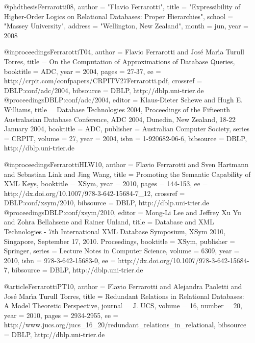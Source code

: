 \documentclass{article}
\begin{document}
@phdthesis{Ferrarotti08,
  author    = "Flavio Ferrarotti",
  title     = "Expressibility of Higher-Order Logics on Relational Databases: Proper Hierarchies",
  school    = "Massey University",
  address   = "Wellington, New Zealand",
  month     = jun,
  year      = 2008
}

@inproceedings{FerrarottiT04,
  author    = {Flavio Ferrarotti and
               Jos{\'e} Mar{\'{\i}}a {Turull Torres}},
  title     = {On the Computation of Approximations of Database Queries},
  booktitle = {ADC},
  year      = {2004},
  pages     = {27-37},
  ee        = {http://crpit.com/confpapers/CRPITV27Ferrarotti.pdf},
  crossref  = {DBLP:conf/adc/2004},
  bibsource = {DBLP, http://dblp.uni-trier.de}
}
@proceedings{DBLP:conf/adc/2004,
  editor    = {Klaus-Dieter Schewe and
               Hugh E. Williams},
  title     = {Database Technologies 2004, Proceedings of the Fifteenth
               Australasian Database Conference, ADC 2004, Dunedin, New
               Zealand, 18-22 January 2004},
  booktitle = {ADC},
  publisher = {Australian Computer Society},
  series    = {CRPIT},
  volume    = {27},
  year      = {2004},
  isbn      = {1-920682-06-6},
  bibsource = {DBLP, http://dblp.uni-trier.de}
}

@inproceedings{FerrarottiHLW10,
  author    = {Flavio Ferrarotti and
               Sven Hartmann and
               Sebastian Link and
               Jing Wang},
  title     = {Promoting the Semantic Capability of {XML} Keys},
  booktitle = {XSym},
  year      = {2010},
  pages     = {144-153},
  ee        = {http://dx.doi.org/10.1007/978-3-642-15684-7_12},
  crossref  = {DBLP:conf/xsym/2010},
  bibsource = {DBLP, http://dblp.uni-trier.de}
}
@proceedings{DBLP:conf/xsym/2010,
  editor    = {Mong-Li Lee and
               Jeffrey Xu Yu and
               Zohra Bellahsene and
               Rainer Unland},
  title     = {Database and {XML} Technologies - 7th International {XML} Database
               Symposium, XSym 2010, Singapore, September 17, 2010. Proceedings},
  booktitle = {XSym},
  publisher = {Springer},
  series    = {Lecture Notes in Computer Science},
  volume    = {6309},
  year      = {2010},
  isbn      = {978-3-642-15683-0},
  ee        = {http://dx.doi.org/10.1007/978-3-642-15684-7},
  bibsource = {DBLP, http://dblp.uni-trier.de}
}

@article{FerrarottiPT10,
  author    = {Flavio Ferrarotti and
               Alejandra Paoletti and
               Jos\'e Mar\'{\i}a {Turull Torres}},
  title     = {Redundant Relations in Relational Databases: A Model Theoretic
               Perspective},
  journal   = {J. UCS},
  volume    = {16},
  number    = {20},
  year      = {2010},
  pages     = {2934-2955},
  ee        = {http://www.jucs.org/jucs_16_20/redundant_relations_in_relational},
  bibsource = {DBLP, http://dblp.uni-trier.de}
}
\end{document}

